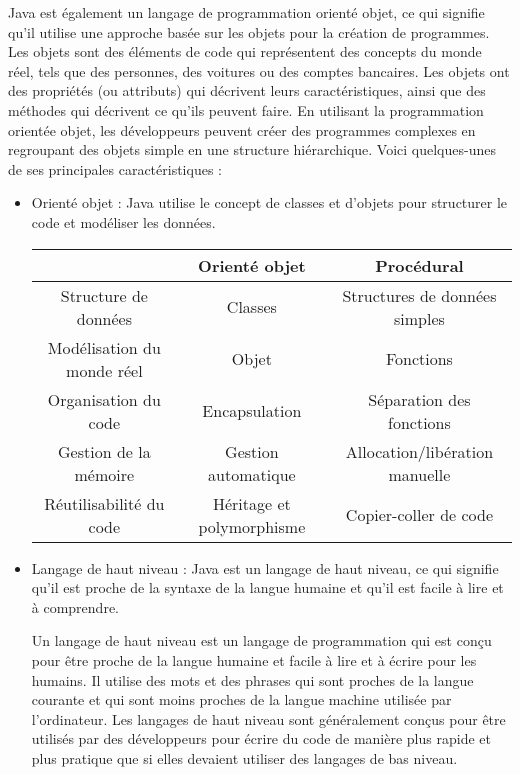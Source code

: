Java est également un langage de programmation orienté objet, ce qui signifie qu'il utilise une approche basée sur les objets pour la création de programmes. Les objets sont des éléments de code qui représentent des concepts du monde réel, tels que des personnes, des voitures ou des comptes bancaires. Les objets ont des propriétés (ou attributs) qui décrivent leurs caractéristiques, ainsi que des méthodes qui décrivent ce qu'ils peuvent faire. En utilisant la programmation orientée objet, les développeurs peuvent créer des programmes complexes en regroupant des objets simple en une structure hiérarchique.
Voici quelques-unes de ses principales caractéristiques :
\begin{itemize}
\item Orienté objet : Java utilise le concept de classes et d'objets pour structurer le code et modéliser les données.


\begin{tabular}{|c|c|c|}
\toprule
& \textbf{Orienté objet} & \textbf{Procédural} \\
\midrule
Structure de données & Classes & Structures de données simples \\
Modélisation du monde réel & Objet & Fonctions \\
Organisation du code & Encapsulation & Séparation des fonctions \\
Gestion de la mémoire & Gestion automatique & Allocation/libération manuelle \\
Réutilisabilité du code & Héritage et polymorphisme & Copier-coller de code \\
\bottomrule
\end{tabular}



\item Langage de haut niveau : Java est un langage de haut niveau, ce qui signifie qu'il est proche de la syntaxe de la langue humaine et qu'il est facile à lire et à comprendre.
\begin{definition}
Un langage de haut niveau est un langage de programmation qui est conçu pour être proche de la langue humaine et facile à lire et à écrire pour les humains. Il utilise des mots et des phrases qui sont proches de la langue courante et qui sont moins proches de la langue machine utilisée par l'ordinateur. Les langages de haut niveau sont généralement conçus pour être utilisés par des développeurs pour écrire du code de manière plus rapide et plus pratique que si elles devaient utiliser des langages de bas niveau.
\end{definition}


\end{itemize}
